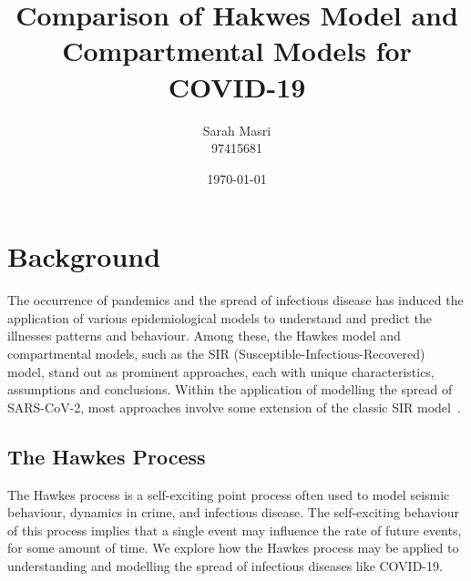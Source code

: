 \documentclass[12pt]{article}
\title{Comparison of Hakwes Model and Compartmental Models for COVID-19}
\author{Sarah Masri \\ 97415681}
\date{\today}
\begin{document}
\maketitle


\thispagestyle{empty}

\begin{abstract}
\noindent  
\end{abstract}





\pagebreak
\section{Background}


The occurrence of pandemics and the spread of infectious disease has induced the application of various epidemiological models to understand and predict the illnesses patterns and behaviour. Among these, the Hawkes model and compartmental models, such as the SIR (Susceptible-Infectious-Recovered) model, stand out as prominent approaches, each with unique characteristics, assumptions and conclusions. Within the application of modelling the spread of SARS-CoV-2, most approaches involve some extension of the classic SIR model~\cite{Garetto2021}.



\subsection{The Hawkes Process}

The Hawkes process is a self-exciting point process often used to model seismic behaviour, dynamics in crime, and infectious disease. The self-exciting behaviour of this process implies that a single event may influence the rate of future events, for some amount of time. We explore how the Hawkes process may be applied to understanding and modelling the spread of infectious diseases like COVID-19. 
\end{document}
